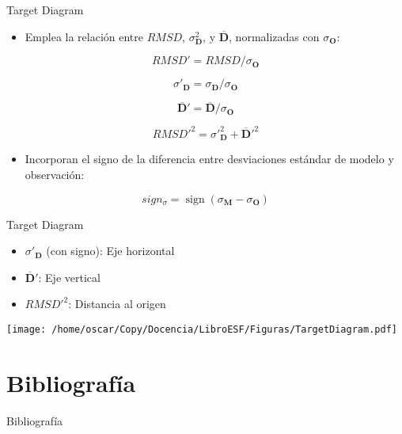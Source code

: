 \documentclass[xcolor={usenames,svgnames,dvipsnames}]{beamer}
\DeclareMathOperator{\sign}{sign}
\let\cite\parencite
\begin{document}
\begin{frame}[label=sec-4-10]{Target Diagram}
\begin{itemize}
\item Emplea la relación entre $RMSD$, $\sigma^2_{\mathbf{D}}$, y $\overline{\mathbf{D}}$, normalizadas con $\sigma_{\mathbf{O}}$:
\end{itemize}
\[
RMSD' = RMSD / \sigma_{\mathbf{O}}
\]

\[
  \sigma'_{\mathbf{D}} = \sigma_{\mathbf{D}} / \sigma_{\mathbf{O}} 
\]

\[
\overline{\mathbf{D}}' = \overline{\mathbf{D}} / \sigma_{\mathbf{O}}
\]

\[
RMSD'^2= \sigma'^2_{\mathbf{D}} + \overline{\mathbf{D}}'^2
\]

\begin{itemize}
\item Incorporan el signo de la diferencia entre desviaciones estándar de modelo y observación:
\end{itemize}

\[
sign_{\sigma} =  \sign(\sigma_{\mathbf{M}} - \sigma_{\mathbf{O}} )
\]

\cite{Jolliff.Kindle.ea2009}
\end{frame}
\begin{frame}[label=sec-4-11]{Target Diagram}
\begin{itemize}
\item $\sigma'_{\mathbf{D}}$ (con signo): Eje horizontal
\item $\overline{\mathbf{D}}'$: Eje vertical
\item $RMSD'^2$: Distancia al origen
\end{itemize}

\begin{center}
\texttt{[image: /home/oscar/Copy/Docencia/LibroESF/Figuras/TargetDiagram.pdf]}
\end{center}
\end{frame}

\section{Bibliografía}
\label{sec-5}

\begin{frame}[allowframebreaks,label=]{Bibliografía}
\printbibliography
\end{frame}
\end{document}
